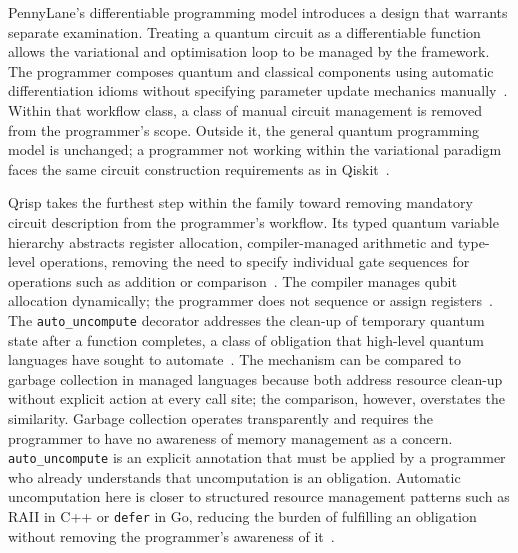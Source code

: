 PennyLane's differentiable programming model introduces a design that warrants separate examination.
Treating a quantum circuit as a differentiable function allows the variational and optimisation loop to be managed by the framework.
The programmer composes quantum and classical components using automatic differentiation idioms without specifying parameter update mechanics manually~\cite{bergholm2018pennylane}.
Within that workflow class, a class of manual circuit management is removed from the programmer's scope.
Outside it, the general quantum programming model is unchanged; a programmer not working within the variational paradigm faces the same circuit construction requirements as in Qiskit~\cite{bergholm2018pennylane, rodriguezdiaz2024qiskitpennylane}.

Qrisp takes the furthest step within the family toward removing mandatory circuit description from the programmer's workflow.
Its typed quantum variable hierarchy abstracts register allocation, compiler-managed arithmetic and type-level operations, removing the need to specify individual gate sequences for operations such as addition or comparison~\cite{seidel2024qrisp}.
The compiler manages qubit allocation dynamically; the programmer does not sequence or assign registers~\cite{seidel2024qrisp}.
The \texttt{auto\_uncompute} decorator addresses the clean-up of temporary quantum state after a function completes, a class of obligation that high-level quantum languages have sought to automate~\cite{bichsel2020silq, seidel2024qrisp}.
The mechanism can be compared to garbage collection in managed languages because both address resource clean-up without explicit action at every call site; the comparison, however, overstates the similarity.
Garbage collection operates transparently and requires the programmer to have no awareness of memory management as a concern.
\texttt{auto\_uncompute} is an explicit annotation that must be applied by a programmer who already understands that uncomputation is an obligation.
Automatic uncomputation here is closer to structured resource management patterns such as RAII in C++ or \texttt{defer} in Go, reducing the burden of fulfilling an obligation without removing the programmer's awareness of it~\cite{seidel2024qrisp}.

